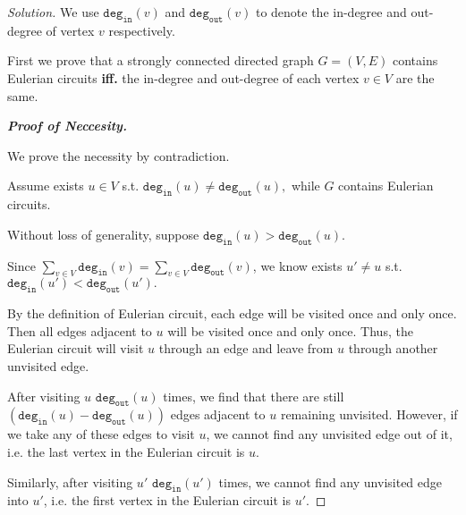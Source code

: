 \documentclass{article}
\newenvironment{solution}{\begin{proof}[\noindent\it Solution]}{\end{proof}}
\begin{document}
\begin{solution}
    We use $\mathtt{deg_{in}}(v)$ and $\mathtt{deg_{out}}(v)$ to denote the in-degree and out-degree of vertex $v$ respectively.
    
    \hspace{2.6em}
    First we prove that a strongly connected directed graph $G=(V,E)$ contains Eulerian circuits \textbf{iff.} the in-degree and out-degree of each vertex $v\in V$ are the same.
    
    
    \hspace{-2em}
    \textbf{\textit{Proof of Neccesity.}}
    
    \vspace{0.3em} \hspace{0.5em}
    We prove the necessity by contradiction. 
    
    \hspace{0.5em}
    Assume exists $u\in V$ s.t. $\mathtt{deg_{in}}(u)\neq \mathtt{deg_{out}}(u),$ while $G$ contains Eulerian circuits. 
    
    \hspace{0.5em}
    Without loss of generality, suppose $\mathtt{deg_{in}}(u)>\mathtt{deg_{out}}(u).$ 
    
    \hspace{0.5em}
    Since $\sum_{v\in V}\mathtt{deg_{in}}(v)=\sum_{v\in V}\mathtt{deg_{out}}(v)$, we know exists $u'\neq u$ s.t. $\mathtt{deg_{in}}(u')<\mathtt{deg_{out}}(u').$
    
    \hspace{0.5em}
    By the definition of Eulerian circuit, each edge will be visited once and only once. Then all edges adjacent to $u$ will be visited once and only once. Thus, the Eulerian circuit will visit $u$ through an edge and leave from $u$ through another unvisited edge.
    
    \hspace{0.5em}
    After visiting $u$ $\mathtt{deg_{out}}(u)$ times, we find that there are still $\left(\mathtt{deg_{in}}(u)-\mathtt{deg_{out}}(u)\right)$ edges adjacent to $u$ remaining unvisited. However, if we take any of these edges to visit $u$, we cannot find any unvisited edge out of it, i.e. the last vertex in the Eulerian circuit is $u$.
    
    \hspace{0.5em}
    Similarly, after visiting $u'$ $\mathtt{deg_{in}}(u')$ times, we cannot find any unvisited edge into $u'$, i.e. the first vertex in the Eulerian circuit is $u'$.
    

\end{solution}
\end{document}
